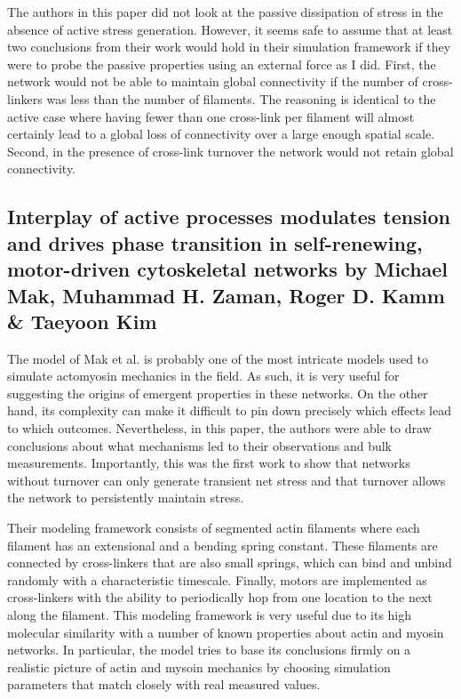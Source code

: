 The authors in this paper did not look at the passive dissipation of stress in the absence of active stress generation.  However, it seems safe to assume that at least two conclusions from their work would hold in their simulation framework if they were to probe the passive properties using an external force as I did.  First, the network would not be able to maintain global connectivity if the number of cross-linkers was less than the number of filaments.  The reasoning is identical to the active case where having fewer than one cross-link per filament will almost certainly lead to a global loss of connectivity over a large enough spatial scale.  Second, in the presence of cross-link turnover the network would not retain global connectivity.  

\subsection{Interplay of active processes modulates tension and drives phase transition in self-renewing, motor-driven cytoskeletal networks by	Michael Mak, Muhammad H. Zaman, Roger D. Kamm \& Taeyoon Kim}

The model of Mak et al.\cite{Mak:2016aa} is probably one of the most intricate models used to simulate actomyosin mechanics in the field.  As such, it is very useful for suggesting the origins of emergent properties in these networks.  On the other hand, its complexity can make it difficult to pin down precisely which effects lead to which outcomes.  Nevertheless, in this paper, the authors were able to draw conclusions about what mechanisms led to their observations and bulk measurements.  Importantly, this was the first work to show that networks without turnover can only generate transient net stress and that turnover allows the network to persistently maintain stress.

Their modeling framework consists of segmented actin filaments where each filament has an extensional and a bending spring constant.  These filaments are connected by cross-linkers that are also small springs, which can bind and unbind randomly with a characteristic timescale.  Finally, motors are implemented as cross-linkers with the ability to periodically hop from one location to the next along the filament.  This modeling framework is very useful due to its high molecular similarity with a number of known properties about actin and myosin networks.  In particular, the model tries to base its conclusions firmly on a realistic picture of actin and mysoin mechanics by choosing simulation parameters that match closely with real measured values.  

